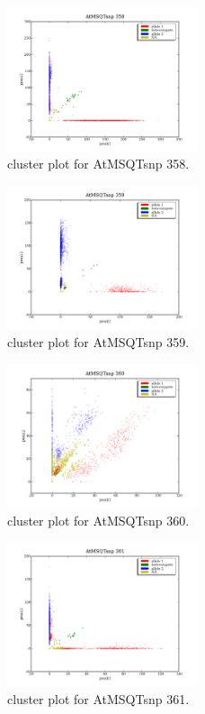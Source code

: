\begin{figure}[H]
\includegraphics[width=0.5\textwidth]{figures/cluster_plot_AtMSQTsnp_358.png}
\caption{cluster plot for AtMSQTsnp 358.} \label{flAtMSQTsnp358}
\end{figure}
\begin{figure}[H]
\includegraphics[width=0.5\textwidth]{figures/cluster_plot_AtMSQTsnp_359.png}
\caption{cluster plot for AtMSQTsnp 359.} \label{flAtMSQTsnp359}
\end{figure}
\begin{figure}[H]
\includegraphics[width=0.5\textwidth]{figures/cluster_plot_AtMSQTsnp_360.png}
\caption{cluster plot for AtMSQTsnp 360.} \label{flAtMSQTsnp360}
\end{figure}
\begin{figure}[H]
\includegraphics[width=0.5\textwidth]{figures/cluster_plot_AtMSQTsnp_361.png}
\caption{cluster plot for AtMSQTsnp 361.} \label{flAtMSQTsnp361}
\end{figure}
